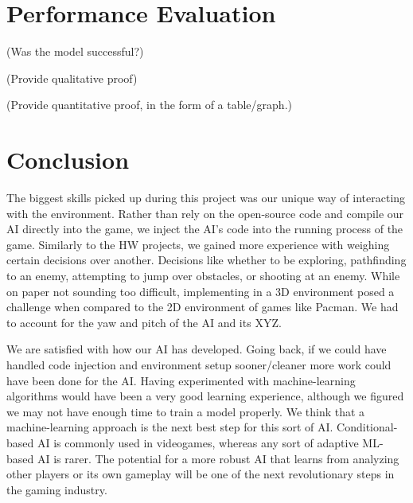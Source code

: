 \documentclass[11pt,a4paper]{article}
\begin{document}
\section{Performance Evaluation}
(Was the model successful?) 

(Provide qualitative proof) 

(Provide quantitative proof, in the form of a table/graph.) 

\section{Conclusion}
The biggest skills picked up during this project was our unique way of interacting with the environment. Rather than rely on the open-source code and compile our AI directly into the game, we inject the AI’s code into the running process of the game. Similarly to the HW projects, we gained more experience with weighing certain decisions over another. Decisions like whether to be exploring, pathfinding to an enemy, attempting to jump over obstacles, or shooting at an enemy. While on paper not sounding too difficult, implementing in a 3D environment posed a challenge when compared to the 2D environment of games like Pacman. We had to account for the yaw and pitch of the AI and its XYZ. 

We are satisfied with how our AI has developed. Going back, if we could have handled code injection and environment setup sooner/cleaner more work could have been done for the AI. Having experimented with machine-learning algorithms would have been a very good learning experience, although we figured we may not have enough time to train a model properly. We think that a machine-learning approach is the next best step for this sort of AI. Conditional-based AI is commonly used in videogames, whereas any sort of adaptive ML-based AI is rarer. The potential for a more robust AI that learns from analyzing other players or its own gameplay will be one of the next revolutionary steps in the gaming industry. 
\end{document}
